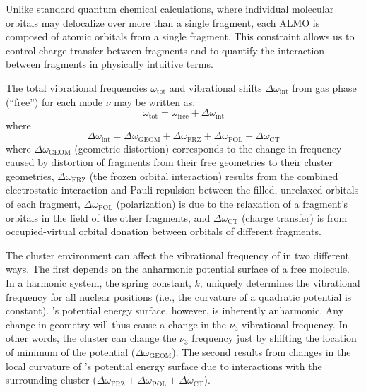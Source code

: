 Unlike standard quantum chemical calculations, where individual molecular orbitals may delocalize over more than a single fragment, each ALMO is composed of atomic orbitals from a single fragment. This constraint allows us to control charge transfer between fragments and to quantify the interaction between fragments in physically intuitive terms.

The total vibrational frequencies $\omega_{\textrm{tot}}$ and vibrational shifts $\Delta \omega_\mathrm{int}$ from gas phase (``free'')  for each mode $\nu$ may be written as:
\begin{equation}
\omega_\mathrm{tot} = \omega_\mathrm{free} + \Delta \omega_\mathrm{int}
\end{equation}
where
\begin{equation}
\Delta \omega_\mathrm{int} = \Delta \omega_\mathrm{GEOM} + \Delta \omega_\mathrm{FRZ} + \Delta \omega_\mathrm{POL} + \Delta \omega_\mathrm{CT}
\end{equation}
where $\Delta \omega_\mathrm{GEOM}$ (geometric distortion) corresponds to the change in frequency caused by distortion of fragments from their free geometries to their cluster geometries, $\Delta \omega_\mathrm{FRZ}$ (the frozen orbital interaction) results from the combined electrostatic interaction and Pauli repulsion between the filled, unrelaxed orbitals of each fragment, $\Delta \omega_\mathrm{POL}$ (polarization) is due to the relaxation of a fragment's orbitals in the field of the other fragments, and $\Delta \omega_\mathrm{CT}$ (charge transfer) is from occupied-virtual orbital donation between orbitals of different fragments.\cite{Ramos-Cordoba2011}

The cluster environment can affect the vibrational frequency of  in two different ways. The first depends on the anharmonic potential surface of a free  molecule. In a harmonic system, the spring constant, $k$, uniquely determines the vibrational frequency for all nuclear positions (i.e., the curvature of a quadratic potential is constant). 's potential energy surface, however, is inherently anharmonic. Any change in geometry will thus cause a change in the $\nu_3$ vibrational frequency. In other words, the cluster can change the $\nu_3$ frequency just by shifting the location of minimum of the  potential ($\Delta \omega_\mathrm{GEOM}$). The second results from changes in the local curvature of 's potential energy surface due to interactions with the surrounding cluster ($\Delta \omega_\mathrm{FRZ} + \Delta\omega_\mathrm{POL} + \Delta \omega_\mathrm{CT}$).

